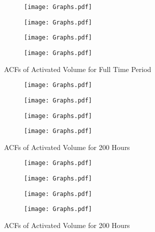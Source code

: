 \documentclass[12pt]{article}
\begin{document}
\begin{appendix}
\newpage
\begin{figure}
\centering
\begin{subfigure}{.5\textwidth}
  \centering
  \texttt{[image: Graphs.pdf]}
\end{subfigure}%
\begin{subfigure}{.5\textwidth}
  \centering
  \texttt{[image: Graphs.pdf]}
\end{subfigure}
\begin{subfigure}{.5\textwidth}
  \centering
  \texttt{[image: Graphs.pdf]}
\end{subfigure}%
\begin{subfigure}{.5\textwidth}
  \centering
  \texttt{[image: Graphs.pdf]}
\end{subfigure}
\caption{ACFs of Activated Volume for Full Time Period}
\label{figure:ACF5}
\end{figure}

\newpage
\begin{figure}
\centering
\begin{subfigure}{.5\textwidth}
  \centering
  \texttt{[image: Graphs.pdf]}
\end{subfigure}%
\begin{subfigure}{.5\textwidth}
  \centering
  \texttt{[image: Graphs.pdf]}
\end{subfigure}
\begin{subfigure}{.5\textwidth}
  \centering
  \texttt{[image: Graphs.pdf]}
\end{subfigure}%
\begin{subfigure}{.5\textwidth}
  \centering
  \texttt{[image: Graphs.pdf]}
\end{subfigure}
\caption{ACFs of Activated Volume for 200 Hours}
\label{figure:ACFshorter1}
\end{figure}


\newpage
\begin{figure}
\centering
\begin{subfigure}{.5\textwidth}
  \centering
  \texttt{[image: Graphs.pdf]}
\end{subfigure}%
\begin{subfigure}{.5\textwidth}
  \centering
  \texttt{[image: Graphs.pdf]}
\end{subfigure}
\begin{subfigure}{.5\textwidth}
  \centering
  \texttt{[image: Graphs.pdf]}
\end{subfigure}%
\begin{subfigure}{.5\textwidth}
  \centering
  \texttt{[image: Graphs.pdf]}
\end{subfigure}
\caption{ACFs of Activated Volume for 200 Hours}
\label{figure:ACFshorter2}
\end{figure}



\end{appendix}
\end{document}
